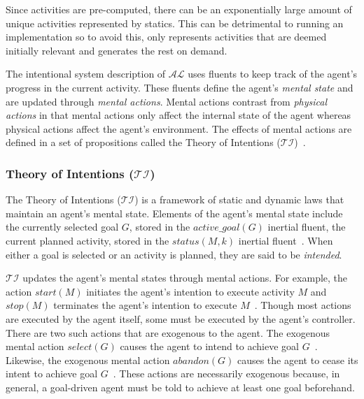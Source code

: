 Since activities are pre-computed, there can be an exponentially large amount of unique activities represented by statics.
This can be detrimental to running an implementation so to avoid this, \citet{blount_architecture_2013} only represents activities that are deemed initially relevant and generates the rest on demand.

The intentional system description of $\mathcal{AL}$ uses fluents to keep track of the agent's progress in the current activity.
These fluents define the agent's \textit{mental state} and are updated through \textit{mental actions}.
Mental actions contrast from \textit{physical actions} in that mental actions only affect the internal state of the agent whereas physical actions affect the agent's environment.
The effects of mental actions are defined in a set of propositions called the Theory of Intentions ($\mathcal{TI}$)~\citep{blount_towards_2014}.

\subsubsection{Theory of Intentions ($\mathcal{TI}$)}
\label{subsubsec:theory_of_intentions}

The Theory of Intentions ($\mathcal{TI}$) is a framework of static and dynamic laws that maintain an agent's mental state.
Elements of the agent's mental state include the currently selected goal $G$, stored in the $active\_goal\left(G\right)$ inertial fluent, the current planned activity, stored in the $status(M, k)$ inertial fluent~\citep{blount_towards_2014}.
When either a goal is selected or an activity is planned, they are said to be \textit{intended}.

$\mathcal{TI}$ updates the agent's mental states through mental actions.
For example, the action $start(M)$ initiates the agent's intention to execute activity $M$ and $stop(M)$ terminates the agent's intention to execute $M$~\citep{blount_towards_2014}.
Though most actions are executed by the agent itself, some must be executed by the agent's controller.
There are two such actions that are exogenous to the agent.
The exogenous mental action $select(G)$ causes the agent to intend to achieve goal $G$~\citep{blount_towards_2014}.
Likewise, the exogenous mental action $abandon(G)$ causes the agent to cease its intent to achieve goal $G$~\citep{blount_towards_2014}.
These actions are necessarily exogenous because, in general, a goal-driven agent must be told to achieve at least one goal beforehand.

